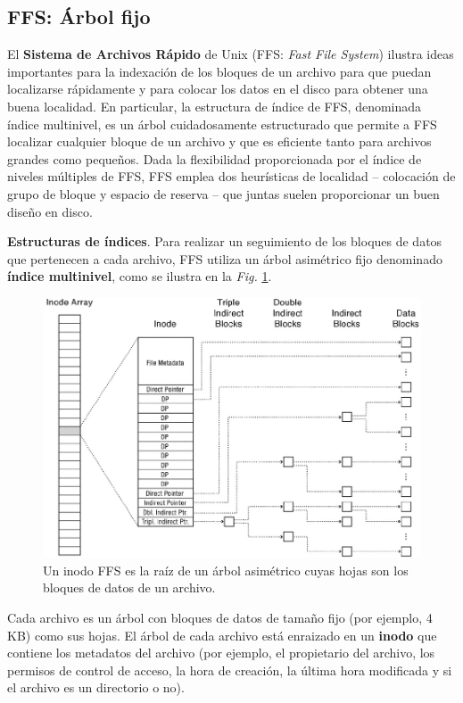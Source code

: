 \documentclass[10pt]{book}
\begin{document}
\subsection{FFS: Árbol fijo}
El \textbf{Sistema de Archivos Rápido} de Unix (FFS: \textit{Fast File System}) ilustra ideas importantes para la indexación de los bloques de un archivo para que puedan localizarse rápidamente y para colocar los datos en el disco para obtener una buena localidad. En particular, la estructura de índice de FFS, denominada índice multinivel, es un árbol cuidadosamente estructurado que permite a FFS localizar cualquier bloque de un archivo y que es eficiente tanto para archivos grandes como pequeños. Dada la flexibilidad proporcionada por el índice de niveles múltiples de FFS, FFS emplea dos heurísticas de localidad -- colocación de grupo de bloque y espacio de reserva -- que juntas suelen proporcionar un buen diseño en disco.

\textbf{Estructuras de índices}. Para realizar un seguimiento de los bloques de datos que pertenecen a cada archivo, FFS utiliza un árbol asimétrico fijo denominado \textbf{índice multinivel}, como se ilustra en la \textit{Fig.} \ref{fig1307}.

\begin{figure}[tbhp]
\centerline{\includegraphics[scale=0.65]{img/fig1307}}
\caption{Un inodo FFS es la raíz de un árbol asimétrico cuyas hojas son los bloques de datos de un archivo.}
\label{fig1307}
\end{figure}

Cada archivo es un árbol con bloques de datos de tamaño fijo (por ejemplo, 4 KB) como sus hojas. El árbol de cada archivo está enraizado en un \textbf{inodo} que contiene los metadatos del archivo (por ejemplo, el propietario del archivo, los permisos de control de acceso, la hora de creación, la última hora modificada y si el archivo es un directorio o no). 
\end{document}
